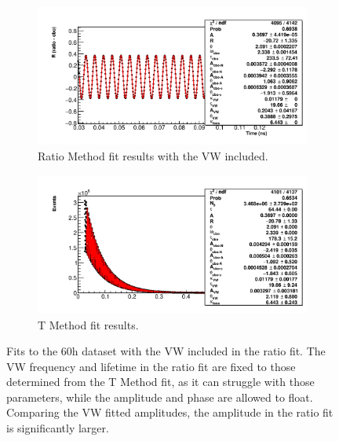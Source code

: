 \documentclass[12pt,letterpaper]{article}
\begin{document}
\begin{figure}[]
\centering
    \begin{subfigure}[]{0.8\textwidth}
        \centering
        \includegraphics[width=\textwidth]{ratioFit_highVWamp}
        \caption{Ratio Method fit results with the VW included.}
    \label{fig:ratioFit_highVWamp}
    \end{subfigure}%
    \vspace{1cm}
    \begin{subfigure}[]{0.8\textwidth}
        \centering
        \includegraphics[width=\textwidth]{TmethodFit_lowVWamp}
        \caption{T Method fit results.}
    \label{fig:TmethodFit_lowVWamp}
    \end{subfigure}
\caption[]{Fits to the 60h dataset with the VW included in the ratio fit. The VW frequency and lifetime in the ratio fit are fixed to those determined from the T Method fit, as it can struggle with those parameters, while the amplitude and phase are allowed to float. Comparing the VW fitted amplitudes, the amplitude in the ratio fit is significantly larger.}
\label{fig:60hfitsVW}
\end{figure}
\end{document}
